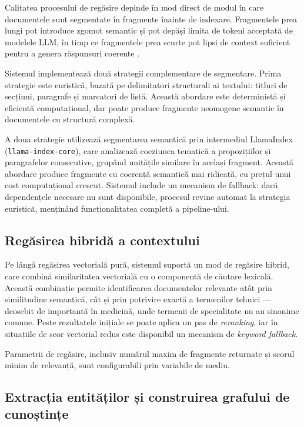 \documentclass[12pt, a4paper, oneside, romanian]{teza-upb}
\begin{document}
Calitatea procesului de regăsire depinde în mod direct de modul în care documentele sunt segmentate în fragmente înainte de indexare. Fragmentele prea lungi pot introduce zgomot semantic și pot depăși limita de tokeni acceptată de modelele LLM, în timp ce fragmentele prea scurte pot lipsi de context suficient pentru a genera răspunsuri coerente \cite{lewis2020retrieval}.

Sistemul implementează două strategii complementare de segmentare. Prima strategie este euristică, bazată pe delimitatori structurali ai textului: titluri de secțiuni, paragrafe și marcatori de listă. Această abordare este deterministă și eficientă computațional, dar poate produce fragmente neomogene semantic în documentele cu structură complexă.

A doua strategie utilizează segmentarea semantică prin intermediul LlamaIndex (\texttt{llama-index-core}), care analizează coeziunea tematică a propozițiilor și paragrafelor consecutive, grupând unitățile similare în același fragment. Această abordare produce fragmente cu coerență semantică mai ridicată, cu prețul unui cost computațional crescut. Sistemul include un mecanism de fallback: dacă dependențele necesare nu sunt disponibile, procesul revine automat la strategia euristică, menținând funcționalitatea completă a pipeline-ului.

\subsection{Regăsirea hibridă a contextului}

Pe lângă regăsirea vectorială pură, sistemul suportă un mod de regăsire hibrid, care combină similaritatea vectorială cu o componentă de căutare lexicală. Această combinație permite identificarea documentelor relevante atât prin similitudine semantică, cât și prin potrivire exactă a termenilor tehnici — deosebit de importantă în medicină, unde termenii de specialitate nu au sinonime comune. Peste rezultatele inițiale se poate aplica un pas de \textit{reranking}, iar în situațiile de scor vectorial redus este disponibil un mecanism de \textit{keyword fallback}.

Parametrii de regăsire, inclusiv numărul maxim de fragmente returnate și scorul minim de relevanță, sunt configurabili prin variabile de mediu.

\subsection{Extracția entităților și construirea grafului de cunoștințe}
\end{document}
